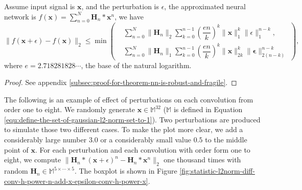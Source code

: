\documentclass[twoside,11pt]{article}
\def\tvar#1{\mathbf{#1}} %
\begin{document}
\begin{theorem}
  Assume input signal is \(\tvar{x}\), and the perturbation is \(\epsilon\), the approximated neural network is \(f(\tvar{x}) = \sum_{n=0}^{N} \tvar{H}_n * \tvar{x}^n\), we have
  \begin{equation}
    \|f(\tvar{x} + \epsilon) - f(\tvar{x})\|_2
    \le \min\left(\begin{aligned}
         & \sum_{n=0}^{N} \| \tvar{H}_n \|_2 \sum_{k=0}^{n-1} \left(\dfrac{e n}{k}\right)^k \|\tvar{x}\|_1^k \| \epsilon \|_1^{n-k},                 \\
         & \sum_{n=0}^{N} \| \tvar{H}_n \|_1 \sum_{k=0}^{n-1} \left(\dfrac{e n}{k}\right)^k \|\tvar{x}\|_{2k}^k \| \tvar{\epsilon} \|_{2(n-k)}^{n-k}
      \end{aligned}\right),
  \end{equation}
  where \(e = 2.718281828\cdots\), the base of the natural logarithm.
  \label{thm:vconv-perturbation-upper-bound}
\end{theorem}

\begin{proof}
  See appendix \ref{subsec:proof-for-theorem-nn-is-robust-and-fragile}.
\end{proof}

The following is an example of effect of perturbations on each convolution from order one to eight.
We randomly generate \(\tvar{x} \in \mathbb{M}^{32}\) (\(\mathbb{M}\) is defined in Equation \ref{equ:define-the-set-of-gaussian-l2-norm-set-to-1}).
Two perturbations are produced to simulate those two different cases.
To make the plot more clear, we add a considerably large number \(3.0\) or a considerably small value \(0.5\) to the middle point of \(\tvar{x}\).
For each perturbation and each convolution with order form one to eight, we compute
  \(\|\tvar{H}_n * (\tvar{x} + \epsilon)^n - \tvar{H}_{n} * \tvar{x}^n\|_2\) one thousand times with random \(\tvar{H}_n \in \mathbb{M}^{5 \times \cdots \times 5}\). The boxplot is shown in Figure \ref{fig:statistic-l2norm-diff-conv-h-power-n-add-x-epsilon-conv-h-power-x}.
\end{document}
